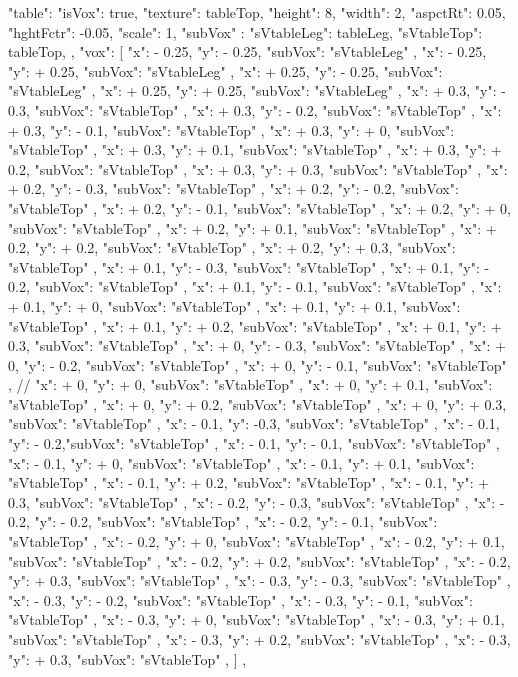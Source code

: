{  "table": {
    "isVox": true,
    "texture": tableTop,
    "height": 8,
    "width": 2,
    "aspctRt": 0.05,
    "hghtFctr": -0.05,
    "scale": 1,
    "subVox" : {
      "sVtableLeg": tableLeg,
      "sVtableTop": tableTop,
    },
    "vox": [
      { "x": - 0.25, "y": - 0.25, "subVox": "sVtableLeg" },
      { "x": - 0.25, "y": + 0.25, "subVox": "sVtableLeg" },
      { "x": + 0.25, "y": - 0.25, "subVox": "sVtableLeg" },
      { "x": + 0.25, "y": + 0.25, "subVox": "sVtableLeg" },
      { "x": + 0.3, "y": - 0.3, "subVox": "sVtableTop" },
      { "x": + 0.3, "y": - 0.2, "subVox": "sVtableTop" },
      { "x": + 0.3, "y": - 0.1, "subVox": "sVtableTop" },
      { "x": + 0.3, "y": + 0, "subVox": "sVtableTop" },
      { "x": + 0.3, "y": + 0.1, "subVox": "sVtableTop" },
      { "x": + 0.3, "y": + 0.2, "subVox": "sVtableTop" },
      { "x": + 0.3, "y": + 0.3, "subVox": "sVtableTop" },
      { "x": + 0.2, "y": - 0.3, "subVox": "sVtableTop" },
      { "x": + 0.2, "y": - 0.2, "subVox": "sVtableTop" },
      { "x": + 0.2, "y": - 0.1, "subVox": "sVtableTop" },
      { "x": + 0.2, "y": + 0, "subVox": "sVtableTop" },
      { "x": + 0.2, "y": + 0.1, "subVox": "sVtableTop" },
      { "x": + 0.2, "y": + 0.2, "subVox": "sVtableTop" },
      { "x": + 0.2, "y": + 0.3, "subVox": "sVtableTop" },
      { "x": + 0.1, "y": - 0.3, "subVox": "sVtableTop" },
      { "x": + 0.1, "y": - 0.2, "subVox": "sVtableTop" },
      { "x": + 0.1, "y": - 0.1, "subVox": "sVtableTop" },
      { "x": + 0.1, "y": + 0, "subVox": "sVtableTop" },
      { "x": + 0.1, "y": + 0.1, "subVox": "sVtableTop" },
      { "x": + 0.1, "y": + 0.2, "subVox": "sVtableTop" },
      { "x": + 0.1, "y": + 0.3, "subVox": "sVtableTop" },
      { "x": + 0, "y": - 0.3, "subVox": "sVtableTop" },
      { "x": + 0, "y": - 0.2, "subVox": "sVtableTop" },
      { "x": + 0, "y": - 0.1, "subVox": "sVtableTop" },
      // { "x": + 0, "y": + 0, "subVox": "sVtableTop" },
      { "x": + 0, "y": + 0.1, "subVox": "sVtableTop" },
      { "x": + 0, "y": + 0.2, "subVox": "sVtableTop" },
      { "x": + 0, "y": + 0.3, "subVox": "sVtableTop" },
      { "x": - 0.1, "y":  -0.3, "subVox": "sVtableTop" },
      { "x": - 0.1, "y": - 0.2,"subVox": "sVtableTop" },
      { "x": - 0.1, "y": - 0.1, "subVox": "sVtableTop" },
      { "x": - 0.1, "y": + 0, "subVox": "sVtableTop" },
      { "x": - 0.1, "y": + 0.1, "subVox": "sVtableTop" },
      { "x": - 0.1, "y": + 0.2, "subVox": "sVtableTop" },
      { "x": - 0.1, "y": + 0.3, "subVox": "sVtableTop" },
      { "x": - 0.2, "y": - 0.3, "subVox": "sVtableTop" },
      { "x": - 0.2, "y": - 0.2, "subVox": "sVtableTop" },
      { "x": - 0.2, "y": - 0.1, "subVox": "sVtableTop" },
      { "x": - 0.2, "y": + 0, "subVox": "sVtableTop" },
      { "x": - 0.2, "y": + 0.1, "subVox": "sVtableTop" },
      { "x": - 0.2, "y": + 0.2, "subVox": "sVtableTop" },
      { "x": - 0.2, "y": + 0.3, "subVox": "sVtableTop" },
      { "x": - 0.3, "y": - 0.3, "subVox": "sVtableTop" },
      { "x": - 0.3, "y": - 0.2, "subVox": "sVtableTop" },
      { "x": - 0.3, "y": - 0.1, "subVox": "sVtableTop" },
      { "x": - 0.3, "y": + 0, "subVox": "sVtableTop" },
      { "x": - 0.3, "y": + 0.1, "subVox": "sVtableTop" },
      { "x": - 0.3, "y": + 0.2, "subVox": "sVtableTop" },
      { "x": - 0.3, "y": + 0.3, "subVox": "sVtableTop" },
    ]
  },


}
